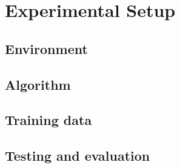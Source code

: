 \section{Experimental Setup}
    \subsection{Environment}

    \subsection{Algorithm}

    \subsection{Training data}

    \subsection{Testing and evaluation}